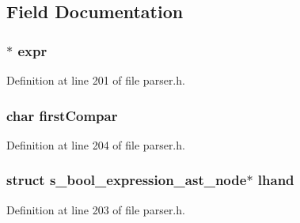 \subsection{Field Documentation}
\hypertarget{structs__bool__expression__ast__node_af0ee16005d665771829bfa0e2ec96040}{
\subsubsection[{expr}]{$\ast$ expr}}\label{structs__bool__expression__ast__node_af0ee16005d665771829bfa0e2ec96040}


Definition at line 201 of file parser.\+h.

\hypertarget{structs__bool__expression__ast__node_a76587d626970df1f76752307a5f5f0e8}{
\subsubsection[{first\+Compar}]{\setlength{\rightskip}{0pt plus 5cm}char first\+Compar}}\label{structs__bool__expression__ast__node_a76587d626970df1f76752307a5f5f0e8}


Definition at line 204 of file parser.\+h.

\hypertarget{structs__bool__expression__ast__node_a44d04c0e6bd351e719a9efa5d645cf2e}{
\subsubsection[{lhand}]{\setlength{\rightskip}{0pt plus 5cm}struct {\bf s\+\_\+bool\+\_\+expression\+\_\+ast\+\_\+node}$\ast$ lhand}}\label{structs__bool__expression__ast__node_a44d04c0e6bd351e719a9efa5d645cf2e}


Definition at line 203 of file parser.\+h.

